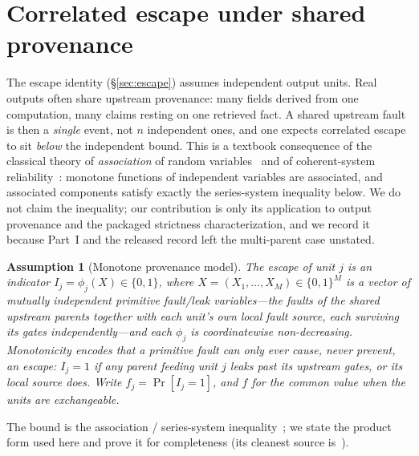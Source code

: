 \documentclass[11pt]{article}
\newtheorem{assumption}{Assumption}
\theoremstyle{definition}
\theoremstyle{remark}
\newcommand{\fesc}{f}
\begin{document}
\section{Correlated escape under shared provenance}\label{sec:corr}
The escape identity (\S\ref{sec:escape}) assumes independent output units. Real outputs often share
upstream provenance: many fields derived from one computation, many claims resting on one retrieved
fact. A shared upstream fault is then a \emph{single} event, not $n$ independent ones, and one expects
correlated escape to sit \emph{below} the independent bound. This is a textbook consequence of the
classical theory of \emph{association} of random variables~\cite{esary1967} and of coherent-system
reliability~\cite{barlowproschan1965}: monotone functions of independent variables are associated, and
associated components satisfy exactly the series-system inequality below. We do not claim the
inequality; our contribution is only its application to output provenance and the packaged strictness
characterization, and we record it because Part~I and the released record left the multi-parent case
unstated.

\begin{assumption}[Monotone provenance model]\label{ass:prov}
The escape of unit $j$ is an indicator $I_j=\phi_j(X)\in\{0,1\}$, where
$X=(X_1,\dots,X_M)\in\{0,1\}^M$ is a vector of \emph{mutually independent} primitive fault/leak
variables---the faults of the shared upstream parents together with each unit's own local fault
source, each surviving its gates independently---and each $\phi_j$ is coordinatewise non-decreasing.
Monotonicity encodes that a primitive fault can only ever cause, never prevent, an escape: $I_j=1$
if any parent feeding unit $j$ leaks past its upstream gates, or its local source does. Write
$\fesc_j=\Pr[I_j=1]$, and $\fesc$ for the common value when the units are exchangeable.
\end{assumption}

The bound is the association / series-system inequality~\cite{esary1967,barlowproschan1965}; we state
the product form used here and prove it for completeness (its cleanest source is~\cite{esary1967}).
\end{document}
